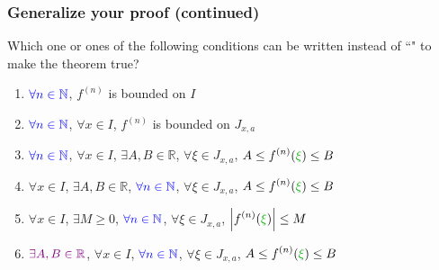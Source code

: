 \documentclass[14pt]{beamer}
\begin{document}
	\begin{frame}[t]
		\fontsize{12}{12}\selectfont
		\frametitle{Generalize your proof (continued)}

		Which one or ones of the following conditions can be written instead of ``"
		to make the theorem true?
		\vspace{.2cm}
		\begin{enumerate}
			\item $\displaystyle{\color{blue} \forall n \in \mathbb{N}}$, \;
				$\displaystyle f^{(n)}$ is bounded on $I$
				\vspace{.2cm}

			\item $\displaystyle{\color{blue} \forall n \in \mathbb{N}}$, \;
				{\color{red} $\displaystyle \forall x \in I$}, \; $\displaystyle f^{(n)}$
				is bounded on $J_{x,a}$
				\vspace{.2cm}

			\item $\displaystyle{\color{blue} \forall n \in \mathbb{N}}$, \;
				{\color{red} $\displaystyle \forall x \in I$}, \; {\color{violet} $\displaystyle \exists A, B \in \mathbb{R}$},
				\; {\color{verde} $\displaystyle \forall \xi \in J_{x,a}$}, \; $\displaystyle
				A \leq f^{(n)}({\color{verde} \xi}) \leq B$
				\vspace{.2cm}

			\item {\color{red} $\displaystyle \forall x \in I$}, \;
				{\color{violet} $\displaystyle \exists A, B \in \mathbb{R}$}, \; $\displaystyle
				{\color{blue} \forall n \in \mathbb{N}}$, \;
				{\color{verde} $\displaystyle \forall \xi \in J_{x,a}$}, \; $\displaystyle
				A \leq f^{(n)}({\color{verde} \xi}) \leq B$
				\vspace{.2cm}

			\item {\color{red} $\displaystyle \forall x \in I$}, \;
				{\color{violet} $\displaystyle \exists M \geq 0$}, \; $\displaystyle{\color{blue} \forall n \in \mathbb{N}}$,
				\; {\color{verde} $\displaystyle \forall \xi \in J_{x,a}$}, \; $\displaystyle
				\left\vert f^{(n)}({\color{verde} \xi}) \right\vert \leq M$
				\vspace{.2cm}

			\item $\displaystyle{\color{violet} \exists A, B \in \mathbb{R}}$, \;
				{\color{red} $\displaystyle \forall x \in I$}, \; $\displaystyle{\color{blue} \forall n \in \mathbb{N}}$,
				\; {\color{verde} $\displaystyle \forall \xi \in J_{x,a}$}, \; $\displaystyle
				A \leq f^{(n)}({\color{verde} \xi}) \leq B$
				\vspace{.2cm}


\end{enumerate}
\end{frame}
\end{document}
